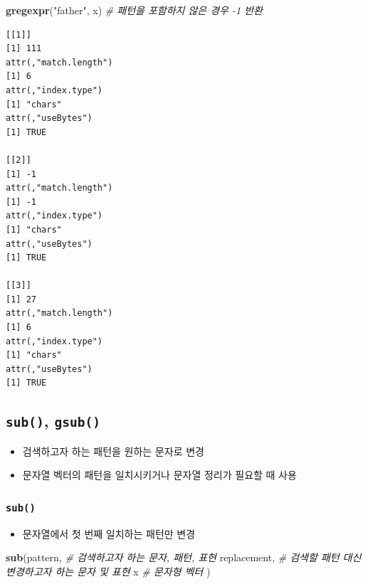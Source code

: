 \documentclass[
  11pt,
]{krantz}
\newenvironment{Shaded}{\begin{snugshade}}{\end{snugshade}}
\newcommand{\CommentTok}[1]{\textcolor[rgb]{0.37,0.37,0.37}{\textit{#1}}}
\newcommand{\KeywordTok}[1]{\textcolor[rgb]{0.27,0.27,0.27}{\textbf{#1}}}
\newcommand{\NormalTok}[1]{#1}
\newcommand{\StringTok}[1]{\textcolor[rgb]{0.5,0.5,0.5}{#1}}
\providecommand{\tightlist}{%
  \setlength{\itemsep}{0pt}\setlength{\parskip}{0pt}}
\begin{document}
\begin{Shaded}
\begin{Highlighting}[]
\KeywordTok{gregexpr}\NormalTok{(}\StringTok{"father"}\NormalTok{, x) }\CommentTok{# 패턴을 포함하지 않은 경우 -1 반환}
\end{Highlighting}
\end{Shaded}

\begin{verbatim}
[[1]]
[1] 111
attr(,"match.length")
[1] 6
attr(,"index.type")
[1] "chars"
attr(,"useBytes")
[1] TRUE

[[2]]
[1] -1
attr(,"match.length")
[1] -1
attr(,"index.type")
[1] "chars"
attr(,"useBytes")
[1] TRUE

[[3]]
[1] 27
attr(,"match.length")
[1] 6
attr(,"index.type")
[1] "chars"
attr(,"useBytes")
[1] TRUE
\end{verbatim}

\normalsize

\hypertarget{sub-gsub-fun}{%
\subsection{\texorpdfstring{\textbf{\texttt{sub()}}, \textbf{\texttt{gsub()}}}{sub(), gsub()}}\label{sub-gsub-fun}}

\begin{itemize}
\item
  검색하고자 하는 패턴을 원하는 문자로 변경
\item
  문자열 벡터의 패턴을 일치시키거나 문자열 정리가 필요할 때 사용
\end{itemize}

\hypertarget{sub}{%
\subsubsection*{\texorpdfstring{\textbf{\texttt{sub()}}}{sub()}}\label{sub}}


\begin{itemize}
\tightlist
\item
  문자열에서 첫 번째 일치하는 패턴만 변경
\end{itemize}

\footnotesize

\begin{Shaded}
\begin{Highlighting}[]
\KeywordTok{sub}\NormalTok{(pattern, }\CommentTok{# 검색하고자 하는 문자, 패턴, 표현}
\NormalTok{    replacement, }\CommentTok{# 검색할 패턴 대신 변경하고자 하는 문자 및 표현}
\NormalTok{    x }\CommentTok{# 문자형 벡터}
\NormalTok{    )}
\end{Highlighting}
\end{Shaded}
\end{document}
